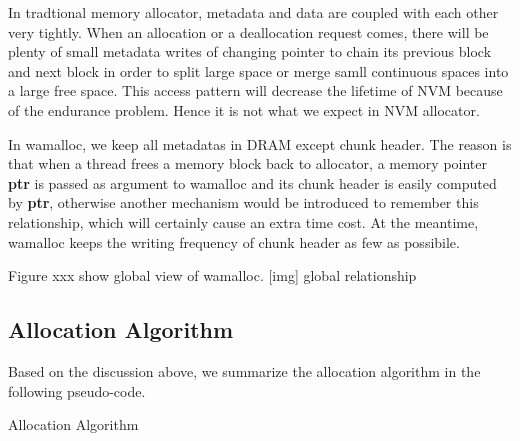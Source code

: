 \documentclass{vldb}
\begin{document}
In tradtional memory allocator, metadata and data are coupled with each other very tightly.
When an allocation or a deallocation request comes, there will be plenty of small metadata writes of changing pointer to chain its previous block and next block in order to split large space or merge samll continuous spaces into a large free space.
This access pattern will decrease the lifetime of NVM because of the endurance problem.
Hence it is not what we expect in NVM allocator.

In wamalloc, we keep all metadatas in DRAM except chunk header. 
The reason is that when a thread frees a memory block back to allocator, a memory pointer \textbf{ptr} is passed as argument to wamalloc and its chunk header is easily computed by \textbf{ptr},
otherwise another mechanism would be introduced to remember this relationship, which will certainly cause an extra time cost.
At the meantime, wamalloc keeps the writing frequency of chunk header as few as possibile.

Figure xxx show global view of wamalloc.
[img] global relationship

\subsection{Allocation Algorithm}

Based on the discussion above, we summarize the allocation algorithm in the following pseudo-code.

\begin{algorithm}
\caption{Allocation Algorithm}\label{euclid}
\end{algorithm}
\end{document}
